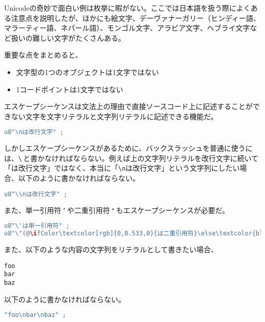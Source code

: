 Unicodeの奇妙で面白い例は枚挙に暇がない。ここでは日本語を扱う際によくある注意点を説明したが、ほかにも絵文字、デーヴァナーガリー（ヒンディー語、マラーティー語、ネパール語）、モンゴル文字、アラビア文字、ヘブライ文字など扱いの難しい文字がたくさんある。

重要な点をまとめると、

\begin{itemize}
\item
  文字型の1つのオブジェクトは1文字ではない
\item
  1コードポイントは1文字ではない
\end{itemize}


エスケープシーケンスは文法上の理由で直接ソースコード上に記述することができない文字を文字リテラルと文字列リテラルに記述できる機能だ。

\begin{lstlisting}[language={C++}]
u8"\nは改行文字" ;
\end{lstlisting}

しかしエスケープシーケンスがあるために、バックスラッシュを普通に使うには、\texttt{{\textbackslash}}\,と書かなければならない。例えば上の文字列リテラルを改行文字に続いて「は改行文字」ではなく、本当に「\texttt{{\textbackslash}n}は改行文字」という文字列にしたい場合、以下のように書かなければならない。

\begin{lstlisting}[language={C++}]
u8"\\nは改行文字" ;
\end{lstlisting}

また、単一引用符\,\texttt{'}\,や二重引用符\,\texttt{"}\,もエスケープシーケンスが必要だ。

\begin{lstlisting}[language={C++}]
u8"\'は単一引用符" ;
u8"\"(@\ifColor\textcolor[rgb]{0,0.533,0}{は二重引用符}\else\textcolor{black}{は二重引用符}\fi@)" ;
\end{lstlisting}

また、以下のような内容の文字列をリテラルとして書きたい場合、
\begin{lstlisting}[style=terminal]
foo
bar
baz
\end{lstlisting}
以下のように書かなければならない。
\begin{lstlisting}[language={C++}]
"foo\nbar\nbaz" ;
\end{lstlisting}

